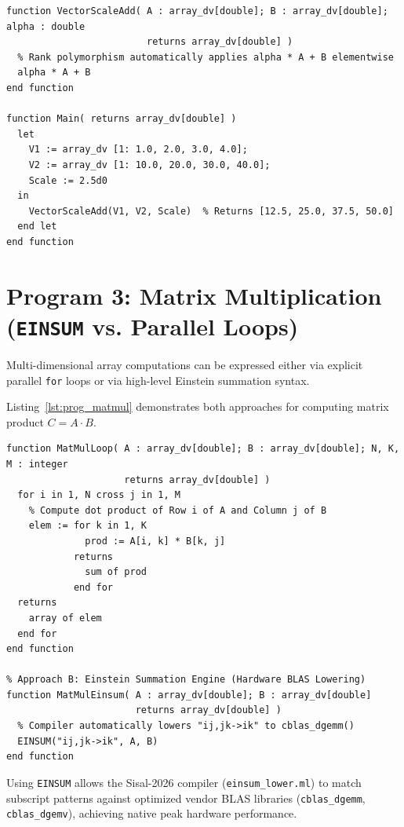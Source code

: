 \begin{lstlisting}[caption={Rank-Polymorphic Vector Arithmetic (\texttt{vector\_ops.sis})},label={lst:prog_vector}]
function VectorScaleAdd( A : array_dv[double]; B : array_dv[double]; alpha : double 
                         returns array_dv[double] )
  % Rank polymorphism automatically applies alpha * A + B elementwise
  alpha * A + B
end function

function Main( returns array_dv[double] )
  let
    V1 := array_dv [1: 1.0, 2.0, 3.0, 4.0];
    V2 := array_dv [1: 10.0, 20.0, 30.0, 40.0];
    Scale := 2.5d0
  in
    VectorScaleAdd(V1, V2, Scale)  % Returns [12.5, 25.0, 37.5, 50.0]
  end let
end function
\end{lstlisting}

\section{Program 3: Matrix Multiplication (\texttt{EINSUM} vs. Parallel Loops)}
Multi-dimensional array computations can be expressed either via explicit parallel \texttt{for} loops or via high-level Einstein summation syntax.

Listing~\ref{lst:prog_matmul} demonstrates both approaches for computing matrix product $C = A \cdot B$.

\begin{lstlisting}[caption={Matrix Multiplication in Sisal-2026 (\texttt{matmul.sis})},label={lst:prog_matmul}]
% Approach A: Explicit Parallel Generator Loop
function MatMulLoop( A : array_dv[double]; B : array_dv[double]; N, K, M : integer 
                     returns array_dv[double] )
  for i in 1, N cross j in 1, M
    % Compute dot product of Row i of A and Column j of B
    elem := for k in 1, K
              prod := A[i, k] * B[k, j]
            returns
              sum of prod
            end for
  returns
    array of elem
  end for
end function

% Approach B: Einstein Summation Engine (Hardware BLAS Lowering)
function MatMulEinsum( A : array_dv[double]; B : array_dv[double] 
                       returns array_dv[double] )
  % Compiler automatically lowers "ij,jk->ik" to cblas_dgemm()
  EINSUM("ij,jk->ik", A, B)
end function
\end{lstlisting}

\begin{note}
Using \texttt{EINSUM} allows the Sisal-2026 compiler (\texttt{einsum\_lower.ml}) to match subscript patterns against optimized vendor BLAS libraries (\texttt{cblas\_dgemm}, \texttt{cblas\_dgemv}), achieving native peak hardware performance.
\end{note}

